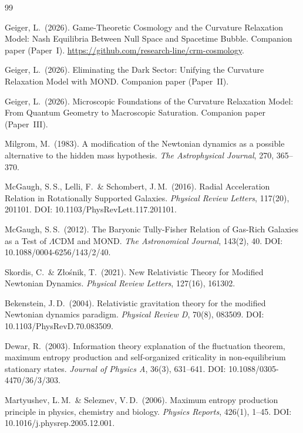 \documentclass[aps,prd,twocolumn,superscriptaddress,nofootinbib]{revtex4-2}
\begin{document}
\begin{thebibliography}{99}

Geiger, L.\ (2026).
Game-Theoretic Cosmology and the Curvature Relaxation Model: Nash Equilibria Between Null Space and Spacetime Bubble.
Companion paper (Paper~I). \url{https://github.com/research-line/crm-cosmology}.

Geiger, L.\ (2026).
Eliminating the Dark Sector: Unifying the Curvature Relaxation Model with MOND.
Companion paper (Paper~II).

Geiger, L.\ (2026).
Microscopic Foundations of the Curvature Relaxation Model: From Quantum Geometry to Macroscopic Saturation.
Companion paper (Paper~III).

Milgrom, M.\ (1983).
A modification of the Newtonian dynamics as a possible alternative to the hidden mass hypothesis.
\textit{The Astrophysical Journal}, 270, 365--370.

McGaugh, S.\,S., Lelli, F.\ \& Schombert, J.\,M.\ (2016).
Radial Acceleration Relation in Rotationally Supported Galaxies.
\textit{Physical Review Letters}, 117(20), 201101.
DOI: 10.1103/PhysRevLett.117.201101.

McGaugh, S.\,S.\ (2012).
The Baryonic Tully-Fisher Relation of Gas-Rich Galaxies as a Test of $\Lambda$CDM and MOND.
\textit{The Astronomical Journal}, 143(2), 40.
DOI: 10.1088/0004-6256/143/2/40.

Skordis, C.\ \& Z{\l}o\'snik, T.\ (2021).
New Relativistic Theory for Modified Newtonian Dynamics.
\textit{Physical Review Letters}, 127(16), 161302.

Bekenstein, J.\,D.\ (2004).
Relativistic gravitation theory for the modified Newtonian dynamics paradigm.
\textit{Physical Review D}, 70(8), 083509.
DOI: 10.1103/PhysRevD.70.083509.

Dewar, R.\ (2003).
Information theory explanation of the fluctuation theorem, maximum entropy production and self-organized criticality in non-equilibrium stationary states.
\textit{Journal of Physics A}, 36(3), 631--641.
DOI: 10.1088/0305-4470/36/3/303.

Martyushev, L.\,M.\ \& Seleznev, V.\,D.\ (2006).
Maximum entropy production principle in physics, chemistry and biology.
\textit{Physics Reports}, 426(1), 1--45.
DOI: 10.1016/j.physrep.2005.12.001.


\end{thebibliography}
\end{document}
